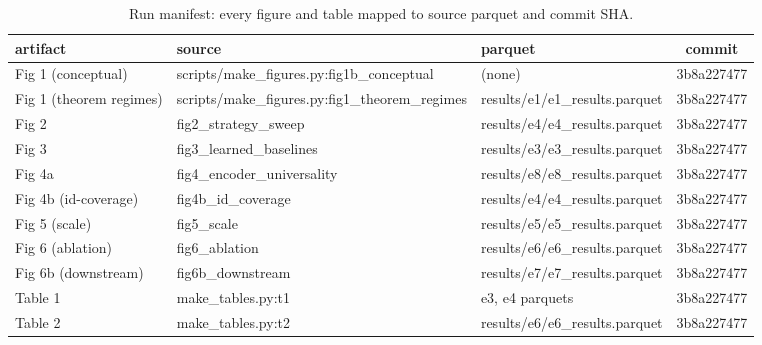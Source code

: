 \begin{table}[t]
\centering
\small
\caption{Run manifest: every figure and table mapped to source parquet and commit SHA.}
\label{tab:manifest}
\begin{tabular}{lllc}
\toprule
artifact & source & parquet & commit \\
\midrule
Fig 1 (conceptual) & scripts/make\_figures.py:fig1b\_conceptual & (none) & 3b8a227477 \\
Fig 1 (theorem regimes) & scripts/make\_figures.py:fig1\_theorem\_regimes & results/e1/e1\_results.parquet & 3b8a227477 \\
Fig 2 & fig2\_strategy\_sweep & results/e4/e4\_results.parquet & 3b8a227477 \\
Fig 3 & fig3\_learned\_baselines & results/e3/e3\_results.parquet & 3b8a227477 \\
Fig 4a & fig4\_encoder\_universality & results/e8/e8\_results.parquet & 3b8a227477 \\
Fig 4b (id-coverage) & fig4b\_id\_coverage & results/e4/e4\_results.parquet & 3b8a227477 \\
Fig 5 (scale) & fig5\_scale & results/e5/e5\_results.parquet & 3b8a227477 \\
Fig 6 (ablation) & fig6\_ablation & results/e6/e6\_results.parquet & 3b8a227477 \\
Fig 6b (downstream) & fig6b\_downstream & results/e7/e7\_results.parquet & 3b8a227477 \\
Table 1 & make\_tables.py:t1 & e3, e4 parquets & 3b8a227477 \\
Table 2 & make\_tables.py:t2 & results/e6/e6\_results.parquet & 3b8a227477 \\
\bottomrule
\end{tabular}
\end{table}
